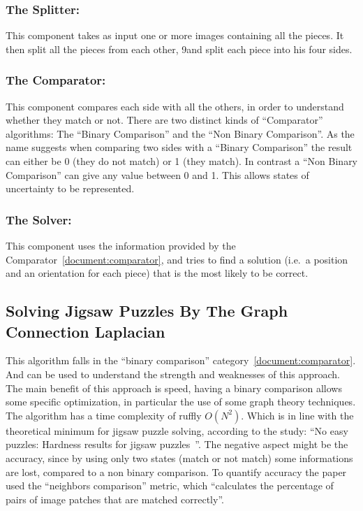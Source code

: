 \documentclass{article}
\newenvironment{indented_section}
  {\adjustwidth{3em}{0pt}}
  {\endadjustwidth}
\begin{document}
\begin{indented_section}

    \subsubsection{The Splitter:} This component takes as input one or more images
    containing all the pieces. It then split all the pieces from each other,
    9and split each piece into his four sides.\label{document:splitter}

    \subsubsection{The Comparator:} This component compares each side with all the
    others, in order to understand whether they match or not.\newline
    There are two distinct kinds of “Comparator” algorithms:
    The “Binary Comparison” and the “Non Binary Comparison”.
    As the name suggests when comparing two sides with a “Binary Comparison”
    the result can either be 0 (they do not match) or 1 (they match).
    In contrast a “Non Binary Comparison” can give any value between 0 and 1.
    This allows states of uncertainty to be represented.\label{document:comparator}

    \subsubsection{The Solver:} This component  uses the information provided by the
    Comparator~\ref{document:comparator}, and tries to find a solution
    (i.e.\ a position and an orientation for each piece)
    that is the most likely to be correct.\label{document:solver}

\end{indented_section}

\subsection{Solving Jigsaw Puzzles By The Graph Connection Laplacian~\cite{GCL}}
This algorithm falls in the “binary comparison” category~\ref{document:comparator}.
And can be used to understand the strength and weaknesses
of this approach.\newline
The main benefit of this approach is speed,  having a binary comparison allows
some specific optimization, in particular the use of some graph theory techniques.\newline
The  algorithm has a time complexity of ruffly \(O(N^2)\). Which is in line with the theoretical
minimum for jigsaw puzzle solving, according to the study:
“No easy puzzles: Hardness results for jigsaw puzzles~\cite{ON2Claim}”.\newline
The negative aspect might be the accuracy, since by using only two states
(match or not match) some informations are lost, compared to a non binary comparison.
To quantify accuracy the paper used the “neighbors comparison” metric,
which “calculates the percentage of pairs of image patches that are matched correctly”.\newline
\label{document:GCL}
\end{document}
